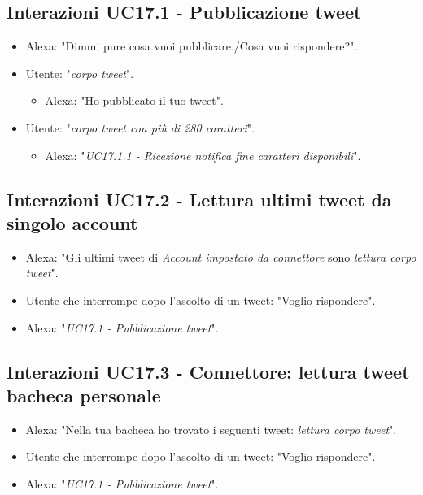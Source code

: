 \subsection{Interazioni UC17.1 - Pubblicazione tweet}
\label{sec:connettore_twitter_scrittura}
\begin{itemize}
        \item Alexa: "Dimmi pure cosa vuoi pubblicare./Cosa vuoi rispondere?".
        \item Utente: "{\it corpo tweet}".
        \begin{itemize}
        \item Alexa: "Ho pubblicato il tuo tweet".
           \end{itemize}
        \item Utente: "{\it corpo tweet con più di 280 caratteri}".
           \begin{itemize}
        \item Alexa: "{\it UC17.1.1 - Ricezione notifica fine caratteri disponibili}".
           \end{itemize}
        
    \end{itemize}


\subsection{Interazioni UC17.2 - Lettura ultimi tweet da singolo account}
\label{sec:connettore_twitter_profilo}
 \begin{itemize}
        \item Alexa: "Gli ultimi tweet di {\it Account impostato da connettore} sono {\it lettura corpo tweet}".
        \item Utente che interrompe dopo l'ascolto di un tweet: "Voglio rispondere".
        \item Alexa: "{\it UC17.1 - Pubblicazione tweet}".
    \end{itemize}


\subsection{Interazioni UC17.3 - Connettore: lettura tweet bacheca personale}
\label{sec:connettore_twitter_bacheca}
 \begin{itemize}
        \item Alexa: "Nella tua bacheca ho trovato i seguenti tweet: {\it lettura corpo tweet}".
        \item Utente che interrompe dopo l'ascolto di un tweet: "Voglio rispondere".
        \item Alexa: "{\it UC17.1 - Pubblicazione tweet}".
    \end{itemize}


